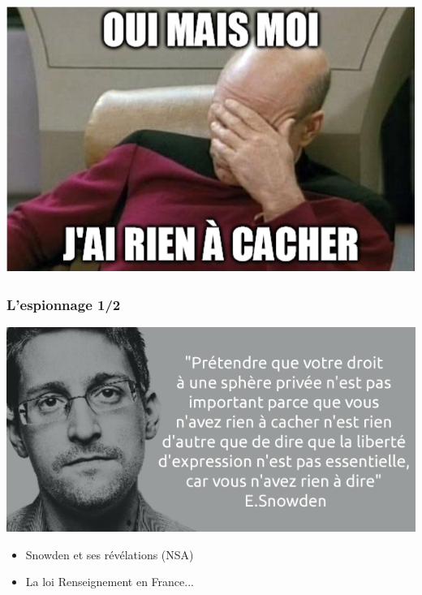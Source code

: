 \documentclass{beamer}
\begin{document}
\begin{frame}
\begin{center}
\includegraphics[scale=0.5] {./images/nothingtohide.png} 
\end{center}
\end{frame}

\begin{frame}
\frametitle{L'espionnage 1/2}
\begin{center}
\includegraphics[scale=0.4]{./images/snowden.png}
\end{center}
\begin{itemize}
\item Snowden et ses révélations (NSA)
\item La loi Renseignement en France...
\end{itemize}
\end{frame}
\end{document}
